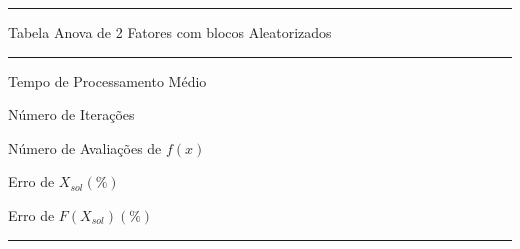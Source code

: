     \begin{minipage}[h!]{\linewidth}
        \centering
        \hrule
        \vspace{2mm}
        {Tabela Anova de 2 Fatores com blocos Aleatorizados}
        \vspace{2mm}
        \noindent
        \hrule 
        \vspace{2mm}
        Tempo de Processamento Médio\\
        \label{tab:tblDa} 
        \writeanova{\tblanovaT}\par
        \bigskip
        \centering
        Número de Iterações\\
        \label{tab:tblDb} 
        \writeanova{\tblanovaNI}\par
        \bigskip
        \centering
        Número de Avaliações de $f(x)$\\
        \label{tab:tblDc} 
        \writeanova{\tblanovaNE}\par
        \bigskip
        \centering
        {Erro de $X_{sol}(\%)$}\\
        \label{tab:tblDb} 
        \writeanova{\tblanovaEX}\par
        \bigskip
        \centering
        {Erro de $F(X_{sol})(\%)$}\\
        \label{tab:tblDb} 
        \writeanova{\tblanovaEF}\par
        \vspace{2mm}
        \hrule
        \vspace{2mm}
    \end{minipage}

